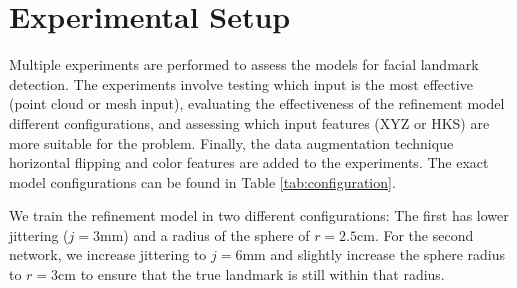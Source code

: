 \documentclass[class=article, crop=false]{standalone}
\begin{document}
\twocolumn

\section{Experimental Setup}\label{sec:exp_setup}


Multiple experiments are performed to assess the models for facial landmark detection. The experiments involve testing which input is the most effective (point cloud or mesh input), evaluating the effectiveness of the refinement model different configurations, and assessing which input features (XYZ or HKS) are more suitable for the problem. Finally, the data augmentation technique horizontal flipping and color features are added to the experiments. The exact model configurations can be found in Table \ref{tab:configuration}.

We train the refinement model in two different configurations: The first has lower jittering ($j=3$mm) and a radius of the sphere of $r=2.5$cm. For the second network, we increase jittering to $j=6$mm and slightly increase the sphere radius to $r=3$cm to ensure that the true landmark is still within that radius.  
\end{document}
